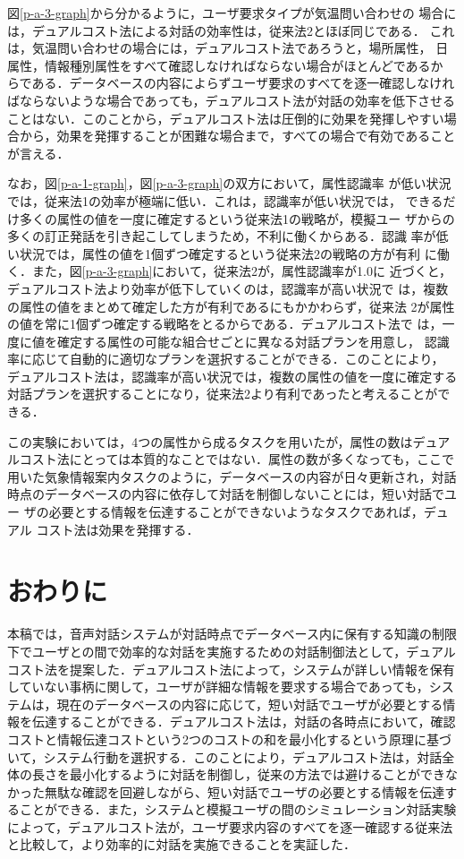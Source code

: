 図\ref{p-a-3-graph}から分かるように，ユーザ要求タイプが気温問い合わせの
場合には，デュアルコスト法による対話の効率性は，従来法2とほぼ同じである．
これは，気温問い合わせの場合には，デュアルコスト法であろうと，場所属性，
日属性，情報種別属性をすべて確認しなければならない場合がほとんどであるか
らである．データベースの内容によらずユーザ要求のすべてを逐一確認しなけれ
ばならないような場合であっても，デュアルコスト法が対話の効率を低下させる
ことはない．このことから，デュアルコスト法は圧倒的に効果を発揮しやすい場
合から，効果を発揮することが困難な場合まで，すべての場合で有効であること
が言える．

なお，図\ref{p-a-1-graph}，図\ref{p-a-3-graph}の双方において，属性認識率
が低い状況では，従来法1の効率が極端に低い．これは，認識率が低い状況では，
できるだけ多くの属性の値を一度に確定するという従来法1の戦略が，模擬ユー
ザからの多くの訂正発話を引き起こしてしまうため，不利に働くからある．認識
率が低い状況では，属性の値を1個ずつ確定するという従来法2の戦略の方が有利
に働く．また，図\ref{p-a-3-graph}において，従来法2が，属性認識率が1.0に
近づくと，デュアルコスト法より効率が低下していくのは，認識率が高い状況で
は，複数の属性の値をまとめて確定した方が有利であるにもかかわらず，従来法
2が属性の値を常に1個ずつ確定する戦略をとるからである．デュアルコスト法で
は，一度に値を確定する属性の可能な組合せごとに異なる対話プランを用意し，
認識率に応じて自動的に適切なプランを選択することができる．このことにより，
デュアルコスト法は，認識率が高い状況では，複数の属性の値を一度に確定する
対話プランを選択することになり，従来法2より有利であったと考えることがで
きる．


この実験においては，4つの属性から成るタスクを用いたが，属性の数はデュア
ルコスト法にとっては本質的なことではない．属性の数が多くなっても，ここで
用いた気象情報案内タスクのように，データベースの内容が日々更新され，対話
時点のデータベースの内容に依存して対話を制御しないことには，短い対話でユー
ザの必要とする情報を伝達することができないようなタスクであれば，デュアル
コスト法は効果を発揮する．


\section{おわりに}
\label{sec-concl}

本稿では，音声対話システムが対話時点でデータベース内に保有する知識の制限
下でユーザとの間で効率的な対話を実施するための対話制御法として，デュアル
コスト法を提案した．デュアルコスト法によって，システムが詳しい情報を保有
していない事柄に関して，ユーザが詳細な情報を要求する場合であっても，シス
テムは，現在のデータベースの内容に応じて，短い対話でユーザが必要とする情
報を伝達することができる．デュアルコスト法は，対話の各時点において，確認
コストと情報伝達コストという2つのコストの和を最小化するという原理に基づ
いて，システム行動を選択する．このことにより，デュアルコスト法は，対話全
体の長さを最小化するように対話を制御し，従来の方法では避けることができな
かった無駄な確認を回避しながら、短い対話でユーザの必要とする情報を伝達す
ることができる．また，システムと模擬ユーザの間のシミュレーション対話実験
によって，デュアルコスト法が，ユーザ要求内容のすべてを逐一確認する従来法
と比較して，より効率的に対話を実施できることを実証した．


